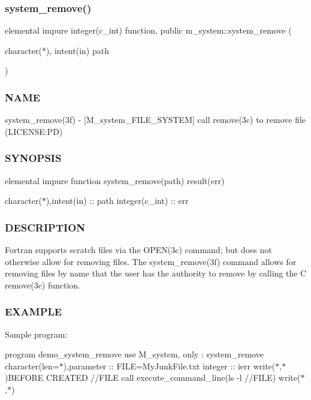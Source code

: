 \subsubsection{\texorpdfstring{system\+\_\+remove()}{system\_remove()}}
{\footnotesize\ttfamily elemental impure integer(c\+\_\+int) function, public m\+\_\+system\+::system\+\_\+remove (\begin{DoxyParamCaption}\item[{character($\ast$), intent(in)}]{path }\end{DoxyParamCaption})}



\subsubsection*{N\+A\+ME}

system\+\_\+remove(3f) -\/ \mbox{[}M\+\_\+system\+\_\+\+F\+I\+L\+E\+\_\+\+S\+Y\+S\+T\+EM\mbox{]} call remove(3c) to remove file (L\+I\+C\+E\+N\+SE\+:PD) \subsubsection*{S\+Y\+N\+O\+P\+S\+IS}

elemental impure function system\+\_\+remove(path) result(err)

character($\ast$),intent(in) \+:\+: path integer(c\+\_\+int) \+:\+: err

\subsubsection*{D\+E\+S\+C\+R\+I\+P\+T\+I\+ON}

Fortran supports scratch files via the O\+P\+E\+N(3c) command; but does not otherwise allow for removing files. The system\+\_\+remove(3f) command allows for removing files by name that the user has the authority to remove by calling the C remove(3c) function.

\subsubsection*{E\+X\+A\+M\+P\+LE}

Sample program\+:

program demo\+\_\+system\+\_\+remove use M\+\_\+system, only \+: system\+\_\+remove character(len=$\ast$),parameter \+:\+: F\+I\+LE=\textquotesingle{}My\+Junk\+File.\+txt\textquotesingle{} integer \+:\+: ierr write($\ast$,$\ast$)\textquotesingle{}B\+E\+F\+O\+RE C\+R\+E\+A\+T\+ED \textquotesingle{}//\+F\+I\+LE call execute\+\_\+command\+\_\+line(\textquotesingle{}ls -\/l \textquotesingle{}//\+F\+I\+LE) write($\ast$,$\ast$)

